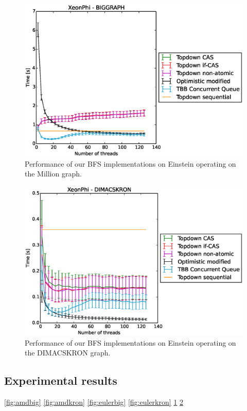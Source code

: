 \documentclass[letterpaper]{article}
\begin{document}
		\begin{figure}\centering
	  		\includegraphics[scale=0.33]{einstein_biggraph.eps}
	  		\caption{Performance of our BFS implementations on Einstein operating on the Million graph.\label{fig:einsteinbig}}
		\end{figure}
		\begin{figure}\centering
	  		\includegraphics[scale=0.33]{einstein_dimacskron.eps}
	  		\caption{Performance of our BFS implementations on Einstein operating on the DIMACSKRON graph.\label{fig:einsteinkron}}
		\end{figure}

	\subsection{Experimental results}
		\ref{fig:amdbig}
		\ref{fig:amdkron}
		\ref{fig:eulerbig}
		\ref{fig:eulerkron}
		\ref{fig:einsteinbig}
		\ref{fig:einsteinkron}
\end{document}
